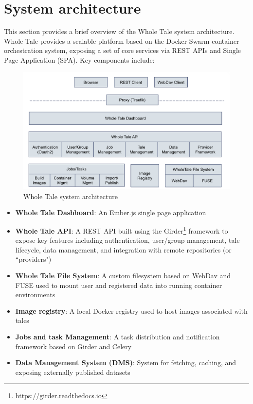 \documentclass[conference]{IEEEtran}
\begin{document}
\section{System architecture} \label{architecture}

This section provides a brief overview of the Whole Tale system architecture.   Whole Tale 
provides a scalable platform based on the Docker Swarm container orchestration system, exposing a 
set of core services via REST APIs and Single Page Application (SPA). Key components include:

\begin{figure}
\centering
\includegraphics[scale=0.25]{images/wholetale-architecture.png}
\caption{Whole Tale system architecture}
\end{figure}

\begin{itemize}
\item{{\bf Whole Tale Dashboard}: An Ember.js single page application}
\item{{\bf Whole Tale API}: A REST API built using the Girder\footnote{https://girder.readthedocs.io} framework to expose key features including authentication, user/group management, tale lifecycle, data management, and integration with remote repositories (or ``providers")}
\item{{\bf Whole Tale File System}: A custom filesystem based on WebDav and FUSE used to mount user and registered data into running container environments}
\item{{\bf Image registry}: A local Docker registry used to host images associated with tales}
\item{{\bf Jobs and task Management}: A task distribution and notification framework based on Girder and Celery}
\item{{\bf Data Management System (DMS)}: System for fetching, caching, and exposing externally published datasets}
\end{itemize}
\end{document}
